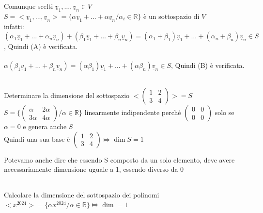 \begin{proposizione}
  \phantom{text}\\
  Comunque scelti $\underline{v}_1,\dots,\underline{v}_n\in V$\\
  $S=<\underline{v}_1,\dots,\underline{v}_n>=\{\alpha\underline{v}_1+\dots+\alpha\underline{v}_n/\alpha_i\in\mathbb{R}\}$
  è un sottospazio di $V$\\
  infatti:
  $(\alpha_1\underline{v}_1+\dots+\alpha_n\underline{v}_n)+(\beta_1\underline{v}_1+\dots+\beta_n\underline{v}_n)=(\alpha_1+\beta_1)\underline{v}_1+\dots+(\alpha_n+\beta_n)\underline{v}_n\in
  S$, Quindi (A) è verificata.\\\\
  $\alpha(\beta_1\underline{v}_1+\dots+\beta_n\underline{v}_n)=(\alpha\beta_1)\underline{v}_1+\dots+(\alpha\beta_n)\underline{v}_n\in
  S$, Quindi (B) è verificata.
\end{proposizione}

\begin{es}
  \phantom{text}\\
  Determinare la dimensione del sottospazio $<
  \begin{pmatrix}
    1&2\\
    3&4
  \end{pmatrix}>=S$\\
  $S=\{
    \begin{pmatrix}
      \alpha& 2\alpha\\
      3\alpha& 4\alpha
  \end{pmatrix}/ \alpha\in\mathbb{R}\}$ linearmente indipendente perché $
  \begin{pmatrix}
    0&0\\
    0&0
  \end{pmatrix}$ solo se $\alpha=0$ e genera anche $S$\\
  Quindi una sua base è $
  \begin{pmatrix}
    1&2\\
    3&4
  \end{pmatrix}\Mapsto\dim S=1$
  \begin{nota}
    Potevamo anche dire che essendo S composto da un solo elemento,
    deve avere necessariamente dimensione uguale a 1, essendo diverso
    da $\underline{0}$
  \end{nota}
\end{es}

\begin{es}
  \phantom{text}\\
  Calcolare la dimensione del sottospazio dei polinomi
  $<x^{2024}>=\{\alpha x^{2024}/\alpha\in\mathbb{R}\}\Mapsto\dim =1$
\end{es}

